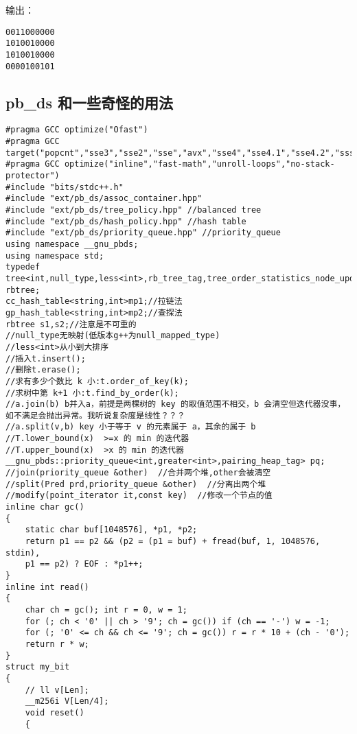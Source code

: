 \documentclass[12pt]{ctexart}
\begin{document}
输出：

\begin{verbatim}
0011000000
1010010000
1010010000
0000100101
\end{verbatim}

\subsection{pb\_ds 和一些奇怪的用法}

\begin{lstlisting}
#pragma GCC optimize("Ofast")
#pragma GCC target("popcnt","sse3","sse2","sse","avx","sse4","sse4.1","sse4.2","ssse3","f16c","fma","avx2","xop","fma4")
#pragma GCC optimize("inline","fast-math","unroll-loops","no-stack-protector")
#include "bits/stdc++.h"
#include "ext/pb_ds/assoc_container.hpp"
#include "ext/pb_ds/tree_policy.hpp" //balanced tree
#include "ext/pb_ds/hash_policy.hpp" //hash table
#include "ext/pb_ds/priority_queue.hpp" //priority_queue
using namespace __gnu_pbds;
using namespace std;
typedef tree<int,null_type,less<int>,rb_tree_tag,tree_order_statistics_node_update> rbtree;
cc_hash_table<string,int>mp1;//拉链法
gp_hash_table<string,int>mp2;//查探法
rbtree s1,s2;//注意是不可重的
//null_type无映射(低版本g++为null_mapped_type)
//less<int>从小到大排序
//插入t.insert();
//删除t.erase();
//求有多少个数比 k 小:t.order_of_key(k);
//求树中第 k+1 小:t.find_by_order(k);
//a.join(b) b并入a，前提是两棵树的 key 的取值范围不相交，b 会清空但迭代器没事，如不满足会抛出异常。我听说复杂度是线性？？？
//a.split(v,b) key 小于等于 v 的元素属于 a，其余的属于 b
//T.lower_bound(x)  >=x 的 min 的迭代器
//T.upper_bound(x)  >x 的 min 的迭代器
__gnu_pbds::priority_queue<int,greater<int>,pairing_heap_tag> pq;
//join(priority_queue &other)  //合并两个堆,other会被清空
//split(Pred prd,priority_queue &other)  //分离出两个堆
//modify(point_iterator it,const key)  //修改一个节点的值
inline char gc()
{
    static char buf[1048576], *p1, *p2;
    return p1 == p2 && (p2 = (p1 = buf) + fread(buf, 1, 1048576, stdin),
    p1 == p2) ? EOF : *p1++;
}
inline int read()
{
    char ch = gc(); int r = 0, w = 1;
    for (; ch < '0' || ch > '9'; ch = gc()) if (ch == '-') w = -1;
    for (; '0' <= ch && ch <= '9'; ch = gc()) r = r * 10 + (ch - '0');
    return r * w;
}
struct my_bit
{
	// ll v[Len];
	__m256i V[Len/4];
	void reset()
	{


\end{lstlisting}
\end{document}
